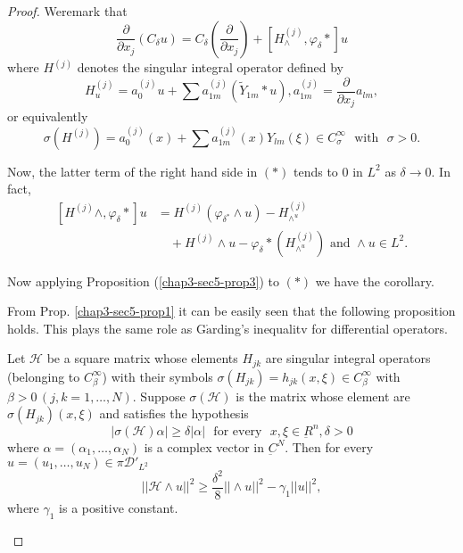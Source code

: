 \begin{proof}%
We\pageoriginale remark that
\begin{equation*}
\frac{\partial}{\partial x_j}(C_\delta u) = C_{\delta}\left(\frac{\partial}
     {\partial x_j}\right) + \left[H^{(j)}_{\wedge},\varphi_{\delta}*
       \right]u  \tag{$\ast$} 
\end{equation*}
where $H^{(j)}$ denotes the singular integral operator defined by 
$$
H^{(j)}_{u} = a_0^{(j)}u + \sum a^{(j)}_{1m}(\tilde{Y}_{1m}*u),
a^{(j)}_{1m} = \frac{\partial}{\partial x_j}a_{lm}, 
$$
or equivalently 
$$
\sigma(H^{(j)}) = a_0^{(j)}(x)+ \sum a^{(j)}_{1m}(x)
Y_{lm} (\xi) \in C^{\infty}_{\sigma} \text{~ with~ } \sigma > 0. 
$$

Now, the latter term of the right hand side in $(*)$ tends to 0 in 
$L^{2}$ as $\delta \to 0$. In fact, 
 \begin{align*}
\left[H^{(j)} \wedge, \varphi_\delta * \right] u  & =
H^{(j)}(\varphi_{\delta^*} 
\wedge u) - H^{(j)}_{\wedge^u}\\
& \quad  + H^{(j)} \wedge u-\varphi_\delta
*(H^{(j)}_{\wedge^u})\text{ and } \wedge u \in L^2. 
\end{align*}

Now applying Proposition (\ref{chap3-sec5-prop3}) to $(*)$ we have the
corollary.  

From Prop. \ref{chap3-sec5-prop1} it can be easily seen that the
following proposition 
holds. This plays the same role as G$\ring{\text{a}}$rding's inequalitv for
differential operators. 

\begin{proposition}%
Let $\mathscr{H}$  be a square matrix whose elements $H_{jk}$ are
singular integral operators (belonging to $C_\beta^{\infty}$) with
their symbols $\sigma(H_{jk}) = h_{jk}(x, \xi)\in
C_{\beta}^{\infty}$ with $\beta > 0\,(j, k=1,\ldots,N)$. Suppose
$\sigma \mathscr{(H)}$ is the matrix whose element are
$\sigma{(H_{jk})(x, \xi)}$ and satisfies the hypothesis  
\begin{equation*}
|\sigma (\mathscr{H})\alpha | \geq \delta | \alpha | \text{~ for every~ }
x, \xi \in \underbar{R}^n, \delta > 0 \tag{5.31} \label{chap3-eq5.31}
\end{equation*}
where $\alpha = (\alpha_1,\ldots, \alpha_N)$ is a complex vector in
$\underbar{C}^{N}$. Then for every $u = (u_1, \ldots , u_N)
\in \pi \mathscr{D}'_{L^2}$\pageoriginale
\begin{equation*}
||\mathscr{H}\wedge u ||^2 \geq \frac{\delta^2}{8}|| \wedge u||^2
-\gamma_{1} || u||^2,\tag{5.32} \label{chap3-eq5.32}
\end{equation*}
where $\gamma_1$ is a positive constant.
\end{proposition}


\end{proof}
